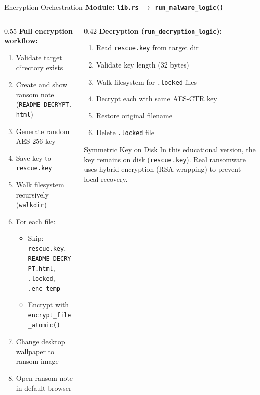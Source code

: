 \documentclass[aspectratio=169]{beamer}
\newcommand{\code}[1]{\texttt{\textcolor{primaryblue}{#1}}}
\begin{document}
\begin{frame}{Encryption Orchestration}
  \textbf{Module: \code{lib.rs} $\rightarrow$ \code{run\_malware\_logic()}}

  \vspace{0.5em}
  \begin{columns}[T]
    \begin{column}{0.55\textwidth}
      \textbf{Full encryption workflow:}
      \begin{enumerate}
        \item Validate target directory exists
        \item Create and show ransom note (\code{README\_DECRYPT.html})
        \item Generate random AES-256 key
        \item Save key to \code{rescue.key}
        \item Walk filesystem recursively (\code{walkdir})
        \item For each file:
        \begin{itemize}
          \item Skip: \code{rescue.key}, \code{README\_DECRYPT.html}, \code{.locked}, \code{.enc\_temp}
          \item Encrypt with \code{encrypt\_file\_atomic()}
        \end{itemize}
        \item Change desktop wallpaper to ransom image
        \item Open ransom note in default browser
      \end{enumerate}
    \end{column}
    \begin{column}{0.42\textwidth}
      \textbf{Decryption (\code{run\_decryption\_logic}):}
      \begin{enumerate}
        \item Read \code{rescue.key} from target dir
        \item Validate key length (32 bytes)
        \item Walk filesystem for \code{.locked} files
        \item Decrypt each with same AES-CTR key
        \item Restore original filename
        \item Delete \code{.locked} file
      \end{enumerate}

      \vspace{0.5em}
      \begin{warnbox}{Symmetric Key on Disk}
        In this educational version, the key remains on disk (\code{rescue.key}). Real ransomware uses hybrid encryption (RSA wrapping) to prevent local recovery.
      \end{warnbox}
    \end{column}
  \end{columns}
\end{frame}
\end{document}
